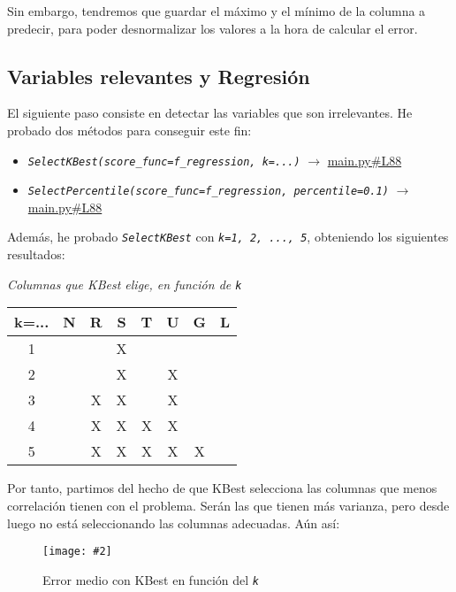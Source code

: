 \documentclass[
12pt, 
spanish, 
singlespacing,
headsepline
]{article}
\newcommand{\image}[2]{
\begin{figure}[H]
	\caption{#1}
	\centering
	\texttt{[image: \#2]}
\end{figure}
}
\begin{document}
Sin embargo, tendremos que guardar el máximo y el mínimo de la columna a predecir, para poder desnormalizar los valores a la hora de calcular el error.

\subsection{Variables relevantes y Regresión}
El siguiente paso consiste en detectar las variables que son irrelevantes. He probado dos métodos para conseguir este fin: 
\begin{itemize}
\item \texttt{\textit{SelectKBest(score_func=f_regression, k=...)}} $\rightarrow$ \href{https://github.com/uo272509/InteligenciaNegocioPL/blob/2cbbd80f0cc88aa40bd462bec7e322e89a958301/Prac3/main.py\#L88}{main.py\#L88}
\item \texttt{\textit{SelectPercentile(score_func=f_regression, percentile=0.1)}} $\rightarrow$ \href{https://github.com/uo272509/InteligenciaNegocioPL/blob/2cbbd80f0cc88aa40bd462bec7e322e89a958301/Prac3/main.py\#L89}{main.py\#L88}
\end{itemize}

Además, he probado \texttt{\textit{SelectKBest}} con \textit{\texttt{k=1, 2, ..., 5}}, obteniendo los siguientes resultados:

\begin{center}
\emph{Columnas que KBest elige, en función de \texttt{\textit{k}}}\\
\begin{tabular}{|c|c|c|c|c|c|c|c|}
\hline k=... & N & R & S & T & U & G & L\\ 
\hline 1 &  &  & X &  &  &  &  \\
\hline 2 &  &  & X &  & X &  &  \\
\hline 3 &  & X & X &  & X &  &  \\
\hline 4 &  & X & X & X & X &  &  \\
\hline 5 &  & X & X & X & X & X &  \\
\hline 
\end{tabular}
\end{center}

Por tanto, partimos del hecho de que KBest selecciona las columnas que menos correlación tienen con el problema. Serán las que tienen más varianza, pero desde luego no está seleccionando las columnas adecuadas. Aún así:

\image{Error medio con KBest en función del \textit{\texttt{k}}}{pl3/Figure_8_Kbest_MeanError.png}
\end{document}
